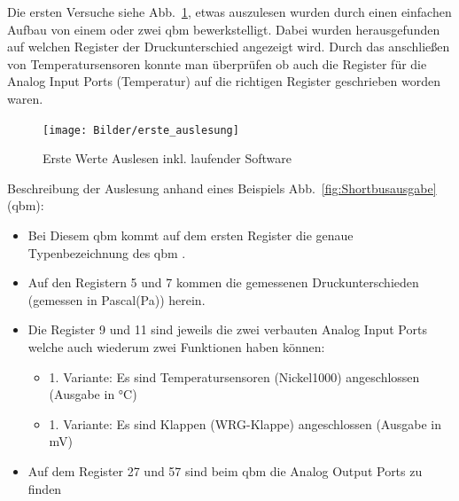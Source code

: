 Die ersten Versuche siehe  Abb.~\ref{fig:ersteauslesung}, etwas auszulesen wurden durch einen einfachen Aufbau von einem oder zwei \gls{qbm}  bewerkstelligt. Dabei wurden herausgefunden auf welchen Register der Druckunterschied angezeigt wird. Durch das anschließen von Temperatursensoren konnte man überprüfen ob auch die Register für die Analog Input Ports (Temperatur) auf die richtigen Register geschrieben worden waren.

\begin{figure}[H]
	\centering
	\texttt{[image: Bilder/erste\_auslesung]}
	\caption{Erste Werte Auslesen inkl. laufender Software} 
	\label{fig:ersteauslesung}
\end{figure}

Beschreibung der Auslesung anhand eines Beispiels Abb.~\ref{fig:Shortbusausgabe} (\gls{qbm}):
\begin{itemize}
	\item Bei Diesem \gls{qbm}  kommt auf dem ersten Register die genaue Typenbezeichnung des \gls{qbm} .  
	\item Auf den Registern 5 und 7 kommen die gemessenen Druckunterschieden (gemessen in Pascal(Pa)) herein. 
	\item Die Register 9 und 11 sind jeweils die zwei verbauten Analog Input Ports welche auch wiederum zwei Funktionen haben können:
	\begin{itemize}
		\item 1. Variante: Es sind Temperatursensoren (\zB Nickel1000) angeschlossen (Ausgabe in °C)
		\item 1. Variante: Es sind Klappen (\zB WRG-Klappe) angeschlossen (Ausgabe in mV)
	\end{itemize}
	\item Auf dem Register 27 und 57 sind beim \gls{qbm} die Analog Output Ports zu finden
	
	\cite[vgl.][]{siemens:2021}
\end{itemize} 
 